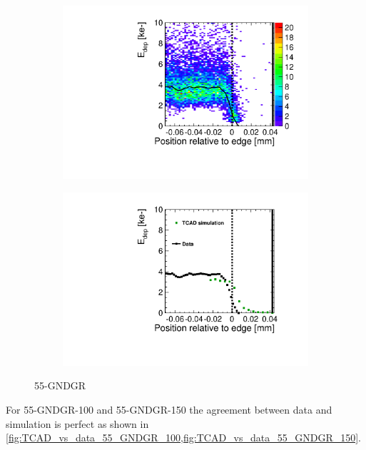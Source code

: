 \begin{figure}[htbp]
  \centering
  \begin{subfigure}[b]{0.5\textwidth}
    \includegraphics[width=\textwidth]{figures/ActiveEdge/TCAD_data_Edep_55_GNDGR.pdf}
    \caption{}
  \end{subfigure}\hfill
  \begin{subfigure}[b]{0.5\textwidth}
    \includegraphics[width=\textwidth]{figures/ActiveEdge/TCAD_data_55_GNDGR.pdf}
    \caption{}
  \end{subfigure}
  \caption{55-GNDGR}
  \label{fig:TCAD_vs_data_55_GNDGR}
\end{figure}

For 55-GNDGR-100 and 55-GNDGR-150 the agreement between data and
simulation is perfect as shown in
\cref{fig:TCAD_vs_data_55_GNDGR_100,fig:TCAD_vs_data_55_GNDGR_150}.

